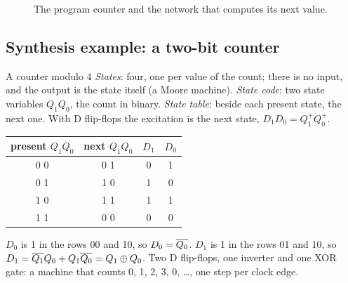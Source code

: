 \begin{figure}[htb]
\centering
{}
\caption{The program counter and the network that computes its next value.}
\label{fig:seq:pc}
\end{figure}

\subsection{Synthesis example: a two-bit counter}

\begin{example}{A counter modulo 4}
\emph{States}: four, one per value of the count; there is no input, and the
output is the state itself (a Moore machine). \emph{State code}: two state
variables $Q_1Q_0$, the count in binary. \emph{State table}: beside each
present state, the next one. With D flip-flops the excitation is the next
state, $D_1D_0=Q_1^{+}Q_0^{+}$.

\begin{center}\small\ttfamily
\begin{tabular}{c|c|cc}
\textrm{present $Q_1Q_0$}&\textrm{next $Q_1Q_0$}&\textrm{$D_1$}&\textrm{$D_0$}\\\hline
0 0&0 1&0&1\\0 1&1 0&1&0\\1 0&1 1&1&1\\1 1&0 0&0&0
\end{tabular}
\end{center}

$D_0$ is 1 in the rows 00 and 10, so $D_0=\overline{Q_0}$. $D_1$ is 1 in the rows
01 and 10, so $D_1=\overline{Q_1}Q_0+Q_1\overline{Q_0}=Q_1\oplus Q_0$. Two D
flip-flops, one inverter and one XOR gate: a machine that counts 0, 1, 2, 3,
0, \ldots, one step per clock edge.
\end{example}

